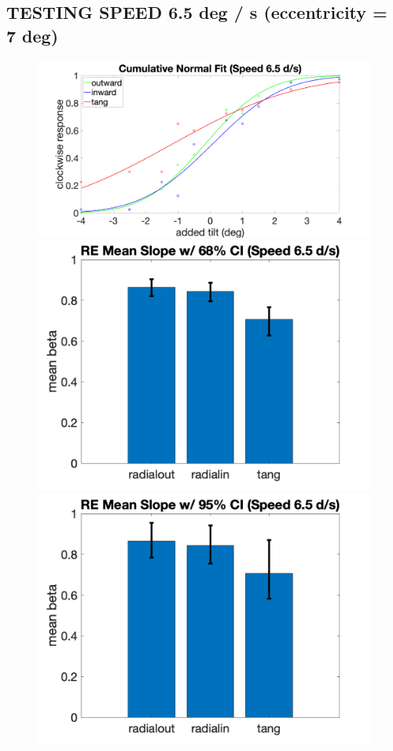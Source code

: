 \documentclass[11pt]{article} %
\begin{document}
\subsection{TESTING SPEED 6.5 deg / s (eccentricity = 7 deg)}
\begin{figure}[H]
\centering %
\includegraphics[scale=.08]{Images/PF_speed6.5.png}
\\
\includegraphics[scale=.2]{Images/MeanSlopeError_68ci_RE_speed6.5.png}
\includegraphics[scale=.2]{Images/MeanSlopeError_95ci_RE_speed6.5.png}

\end{figure}
\end{document}
